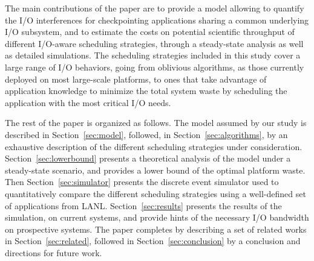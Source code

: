 The main contributions of the paper are to provide a model allowing to quantify
the I/O interferences for checkpointing applications sharing a common underlying I/O
subsystem, and to estimate the costs on potential scientific throughput of different I/O-aware
scheduling strategies, through
a steady-state analysis as well as detailed simulations.
The scheduling strategies included in this study cover a
large range of I/O behaviors, going from oblivious algorithms, as those
currently deployed on most large-scale platforms, to ones that take advantage of
application knowledge to minimize the total system waste by scheduling the
application with the most critical I/O needs.

The rest of the paper is organized as follows. The model assumed by our study is
described in  Section~\ref{sec:model}, followed, in
Section~\ref{sec:algorithms}, by an exhaustive description of the different
scheduling strategies under consideration. Section~\ref{sec:lowerbound}
presents a theoretical analysis of the model under a steady-state scenario, and
provides a lower bound of the optimal platform waste. Then
Section~\ref{sec:simulator} presents the discrete event simulator used to
quantitatively compare the different scheduling strategies using a well-defined
set of applications from LANL. Section~\ref{sec:results} presents the results of
the simulation, on current systems, and provide hints of the necessary I/O
bandwidth on prospective systems. The paper completes by describing a set of
related works in Section~\ref{sec:related}, followed in
Section~\ref{sec:conclusion} by a conclusion and directions for future work.

